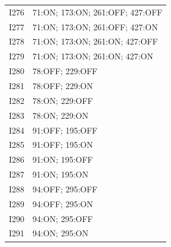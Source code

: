 {\begin{longtable}{lp{.85\linewidth}}
I276 & 71:ON; 173:ON; 261:OFF; 427:OFF \\
I277 & 71:ON; 173:ON; 261:OFF; 427:ON \\
I278 & 71:ON; 173:ON; 261:ON; 427:OFF \\
I279 & 71:ON; 173:ON; 261:ON; 427:ON \\
I280 & 78:OFF; 229:OFF \\
I281 & 78:OFF; 229:ON \\
I282 & 78:ON; 229:OFF \\
I283 & 78:ON; 229:ON \\
I284 & 91:OFF; 195:OFF \\
I285 & 91:OFF; 195:ON \\
I286 & 91:ON; 195:OFF \\
I287 & 91:ON; 195:ON \\
I288 & 94:OFF; 295:OFF \\
I289 & 94:OFF; 295:ON \\
I290 & 94:ON; 295:OFF \\
I291 & 94:ON; 295:ON \\
\end{longtable}}

